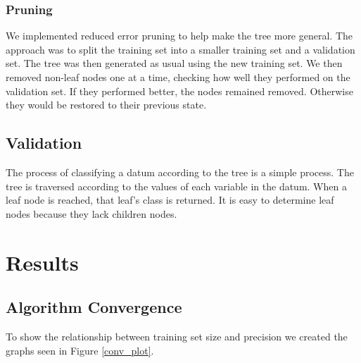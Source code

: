 \documentclass{article}
\begin{document}
	\subsubsection{Pruning}
	We implemented reduced error pruning to help make the tree more general. The approach was to split the training set into a smaller training set and a validation set. The tree was then generated as usual using the new training set. We then removed non-leaf nodes one at a time, checking how well they performed on the validation set. If they performed better, the nodes remained removed. Otherwise they would be restored to their previous state.
	\subsection{Validation}
	The process of classifying a datum according to the tree is a simple process. The tree is traversed according to the values of each variable in the datum. When a leaf node is reached, that leaf's class is returned. It is easy to determine leaf nodes because they lack children nodes.
	
\section{Results}
	\subsection{Algorithm Convergence}
	To show the relationship between training set size and precision we created the graphs seen in Figure  \ref{conv_plot}.
\end{document}
